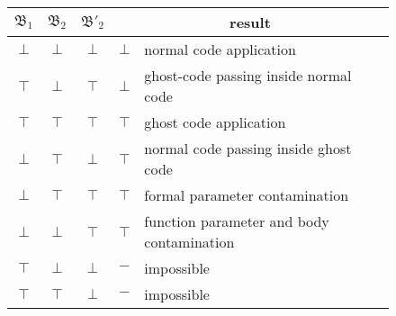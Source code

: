 \begin{figure}[H]
\begin{center}
\begin{tabular}{|c|c|c|c|l|}
\hline
$\mathfrak{B_{1}}$ & $\mathfrak{B_{2}}$ & $\mathfrak{B'_{2}}$
 &  \multicolumn{2}{c|}{result} \\
\hline
$\bot$ & $\bot$ & $\bot$ & $\bot$ &  normal code application \\ \hline
$\top$ & $\bot$ & $\top$ & $\bot$ &  ghost-code passing inside normal code
\\ \hline
$\top$ & $\top$ & $\top$ & $\top$ &  ghost code application \\ \hline
$\bot$ & $\top$ & $\bot$ & $\top$ &  normal code passing inside ghost code
 \\ \hline
 \rowcolor{lightgray} 
 $\bot$ & $\top$ & $\top$ & $\top$ &formal parameter contamination \\ \hline
  \rowcolor{lightgray} 
 $\bot$ & $\bot$ & $\top$ & $\top$ &function parameter and body contamination \\ \hline
  $\top$ & $\bot$ & $\bot$ & $-$ & impossible \\ \hline
 $\top$ & $\top$ & $\bot$ & $-$ & impossible \\ \hline
 
\end{tabular}
\end{center}
\end{figure}  

 





